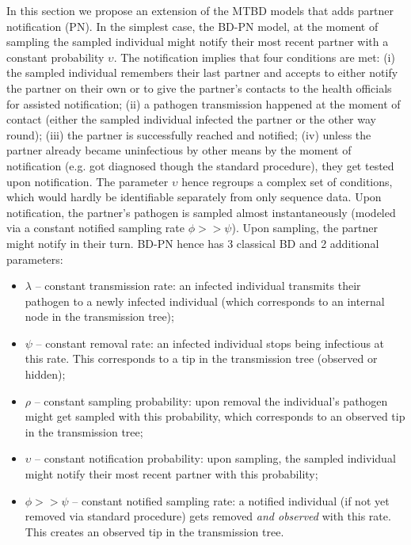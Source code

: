 \documentclass[a4paper,10pt]{article}
\begin{document}
In this section we propose an %
extension of the MTBD models that adds partner notification (PN).  In the simplest case, the BD-PN model, at the moment of sampling the sampled individual might notify their most recent partner with a constant probability $\upsilon$. The notification implies that four conditions are met: (i) the sampled individual remembers their last partner and accepts to either notify the partner on their own or to give the partner's contacts to the health officials for assisted notification; (ii) a pathogen transmission happened at the moment of contact (either the sampled individual infected the partner or the other way round); (iii) the partner is successfully reached and notified; (iv) unless the partner already became uninfectious by other means by the moment of notification (e.g. got diagnosed though the standard procedure), they get tested upon notification. The parameter $\upsilon$ hence regroups a complex set of conditions, which would hardly be identifiable separately from only sequence data. Upon notification, the partner's pathogen is sampled almost instantaneously (modeled via a constant notified sampling rate $\phi >> \psi$). Upon sampling, the partner might notify in their turn. BD-PN hence has 3 classical BD and 2 additional parameters:
\begin{itemize}
 \item $\lambda$ -- constant transmission rate: an infected individual transmits their pathogen to a newly infected individual (which corresponds to an internal node in the transmission tree);
 \item $\psi$ -- constant removal rate: an infected individual stops being infectious at this rate. This corresponds to a tip in the transmission tree (observed or hidden);
 \item $\rho$ -- constant sampling probability: upon removal the individual's pathogen might get sampled with this probability, which corresponds to an observed tip in the transmission tree;
 \item $\upsilon$ -- constant notification probability: upon sampling, the sampled individual might notify their most recent partner with this probability;
 \item $\phi >> \psi$ -- constant notified sampling rate: a notified individual (if not yet removed via standard procedure) gets removed \textit{and observed} with this rate. This creates an observed tip in the transmission tree. 
\end{itemize}
\end{document}
